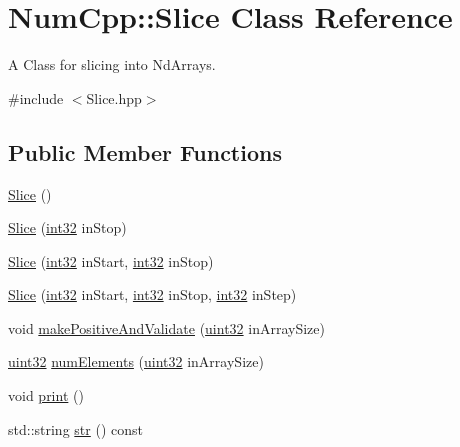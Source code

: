 \hypertarget{class_num_cpp_1_1_slice}{}\section{Num\+Cpp\+:\+:Slice Class Reference}
\label{class_num_cpp_1_1_slice}


A Class for slicing into Nd\+Arrays.  




{\ttfamily \#include $<$Slice.\+hpp$>$}

\subsection*{Public Member Functions}
\begin{DoxyCompactItemize}
\item 
\mbox{\hyperlink{class_num_cpp_1_1_slice_afb92692f125347a65ef8bcb360529afc}{Slice}} ()
\item 
\mbox{\hyperlink{class_num_cpp_1_1_slice_a396190f16de290b03b8ba4b46cad0cfd}{Slice}} (\mbox{\hyperlink{namespace_num_cpp_acf3eb1592f8b248ff0a236634864633c}{int32}} in\+Stop)
\item 
\mbox{\hyperlink{class_num_cpp_1_1_slice_af6f987a9f02fd455e41b2b1b8616782a}{Slice}} (\mbox{\hyperlink{namespace_num_cpp_acf3eb1592f8b248ff0a236634864633c}{int32}} in\+Start, \mbox{\hyperlink{namespace_num_cpp_acf3eb1592f8b248ff0a236634864633c}{int32}} in\+Stop)
\item 
\mbox{\hyperlink{class_num_cpp_1_1_slice_aad688cba1c49dd4f6c74aa740c6301b2}{Slice}} (\mbox{\hyperlink{namespace_num_cpp_acf3eb1592f8b248ff0a236634864633c}{int32}} in\+Start, \mbox{\hyperlink{namespace_num_cpp_acf3eb1592f8b248ff0a236634864633c}{int32}} in\+Stop, \mbox{\hyperlink{namespace_num_cpp_acf3eb1592f8b248ff0a236634864633c}{int32}} in\+Step)
\item 
void \mbox{\hyperlink{class_num_cpp_1_1_slice_a91256eecc37240cb46b394d4a24d019f}{make\+Positive\+And\+Validate}} (\mbox{\hyperlink{namespace_num_cpp_a36f388e948380413c63011cab9b7fbd5}{uint32}} in\+Array\+Size)
\item 
\mbox{\hyperlink{namespace_num_cpp_a36f388e948380413c63011cab9b7fbd5}{uint32}} \mbox{\hyperlink{class_num_cpp_1_1_slice_af3ee8316724829adde628338c0b226ee}{num\+Elements}} (\mbox{\hyperlink{namespace_num_cpp_a36f388e948380413c63011cab9b7fbd5}{uint32}} in\+Array\+Size)
\item 
void \mbox{\hyperlink{class_num_cpp_1_1_slice_adb10794ccc51c541a007403455073621}{print}} ()
\item 
std\+::string \mbox{\hyperlink{class_num_cpp_1_1_slice_a1d653c371a7933ed07c0a0862779edea}{str}} () const
\end{DoxyCompactItemize}
